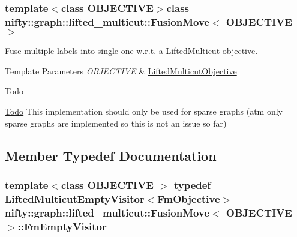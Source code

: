 \subsubsection*{template$<$class O\+B\+J\+E\+C\+T\+I\+V\+E$>$class nifty\+::graph\+::lifted\+\_\+multicut\+::\+Fusion\+Move$<$ O\+B\+J\+E\+C\+T\+I\+V\+E $>$}

Fuse multiple labels into single one w.\+r.\+t. a Lifted\+Multicut objective. 


\begin{DoxyTemplParams}{Template Parameters}
{\em O\+B\+J\+E\+C\+T\+I\+V\+E} & \hyperlink{classnifty_1_1graph_1_1lifted__multicut_1_1LiftedMulticutObjective}{Lifted\+Multicut\+Objective}\\
\hline
\end{DoxyTemplParams}
\begin{DoxyRefDesc}{Todo}
\item[\hyperlink{todo__todo000001}{Todo}]This implementation should only be used for sparse graphs (atm only sparse graphs are implemented so this is not an issue so far) \end{DoxyRefDesc}


\subsection{Member Typedef Documentation}
\hypertarget{classnifty_1_1graph_1_1lifted__multicut_1_1FusionMove_a33e1bb0f26d7ebc7a034d3cd091d3f42}{}
\subsubsection[{Fm\+Empty\+Visitor}]{\setlength{\rightskip}{0pt plus 5cm}template$<$class O\+B\+J\+E\+C\+T\+I\+V\+E $>$ typedef {\bf Lifted\+Multicut\+Empty\+Visitor}$<${\bf Fm\+Objective}$>$ {\bf nifty\+::graph\+::lifted\+\_\+multicut\+::\+Fusion\+Move}$<$ O\+B\+J\+E\+C\+T\+I\+V\+E $>$\+::{\bf Fm\+Empty\+Visitor}}\label{classnifty_1_1graph_1_1lifted__multicut_1_1FusionMove_a33e1bb0f26d7ebc7a034d3cd091d3f42}
\hypertarget{classnifty_1_1graph_1_1lifted__multicut_1_1FusionMove_a673b31d12a14cc0303334d17ac46a0db}{}
